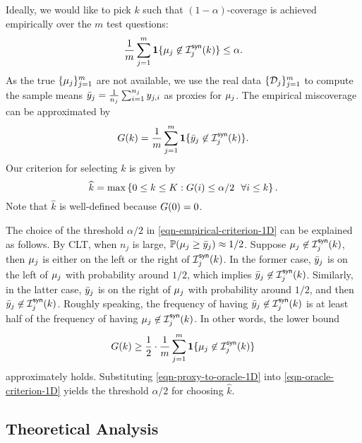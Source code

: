 Ideally, we would like to pick $k$ such that $(1-\alpha)$-coverage is achieved empirically over the $m$ test questions:
\begin{equation}\label{eqn-oracle-criterion-1D}
\frac{1}{m} \sum_{j=1}^m \operatorname{\mathbf{1}} \{ \mu_j \not\in \mathcal{I}^{\mathsf{syn}}_j(k) \} \le \alpha.
\end{equation}
As the true $\{\mu_j\}_{j=1}^m$ are not available, we use the real data $\{ \mathcal{D}_j \}_{j=1}^m$ to compute the sample means $\bar{y}_j = \frac{1}{n_j} \sum_{i=1}^{n_j} y_{j,i}$ as proxies for $\mu_j$. The empirical miscoverage can be approximated by
\begin{equation}\label{eqn-proxy-1D}
G(k) = \frac{1}{m} \sum_{j=1}^m \operatorname{\mathbf{1}} \{ \bar{y}_j \not\in \mathcal{I}^{\mathsf{syn}}_j(k) \}.
\end{equation}
Our criterion for selecting $k$ is given by
\begin{equation}\label{eqn-empirical-criterion-1D}
\widehat{k} = \max \left\{ 0\le k \le K : G(i) \le \alpha/2 ~~\forall i\le k \right\}.
\end{equation}
Note that $\widehat{k}$ is well-defined because $G(0) = 0$.

The choice of the threshold $\alpha/2$ in \eqref{eqn-empirical-criterion-1D} can be explained as follows. By CLT, when $n_j$ is large, $\mathbb{P}( \mu_{j} \ge \bar{y}_j ) \approx 1/2$. Suppose $\mu_{j} \not\in \mathcal{I}^{\mathsf{syn}}_j(k)$, then  $\mu_{j}$ is either on the left or the right of $\mathcal{I}^{\mathsf{syn}}_j(k)$. In the former case, $\bar{y}_j$ is on the left of $\mu_{j}$ with probability around $1/2$, which implies $\bar{y}_j \not\in \mathcal{I}^{\mathsf{syn}}_j(k)$. Similarly, in the latter case, $\bar{y}_j$ is on the right of $\mu_{j}$ with probability around $1/2$, and then $\bar{y}_j \not\in \mathcal{I}^{\mathsf{syn}}_j(k)$. Roughly speaking, the frequency of having $\bar{y}_j \not\in \mathcal{I}^{\mathsf{syn}}_j(k)$ is at least half of the frequency of having $\mu_{j} \not\in \mathcal{I}^{\mathsf{syn}}_j(k)$. In other words, the lower bound
\begin{equation}\label{eqn-proxy-to-oracle-1D}
G(k) \geq \frac{1}{2} \cdot \frac{1}{m} \sum_{j=1}^m \operatorname{\mathbf{1}} \{ \mu_{j} \not\in \mathcal{I}^{\mathsf{syn}}_j(k) \} 
\end{equation}
approximately holds. Substituting \eqref{eqn-proxy-to-oracle-1D} into \eqref{eqn-oracle-criterion-1D} yields the threshold $\alpha/2$ for choosing $\widehat{k}$. 


\subsection{Theoretical Analysis}\label{sec-theory-1D}

